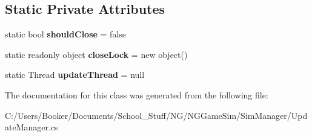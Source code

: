 \subsection*{Static Private Attributes}
\begin{DoxyCompactItemize}
\item 
\mbox{\label{class_n_g_sim_1_1_update_manager_a38b38d1c0b6bcc4415d72e0d7cead01f}} 
static bool {\bfseries should\+Close} = false
\item 
\mbox{\label{class_n_g_sim_1_1_update_manager_aa4e4b224b2d1cf86b2823c58a4ddf80d}} 
static readonly object {\bfseries close\+Lock} = new object()
\item 
\mbox{\label{class_n_g_sim_1_1_update_manager_ac522b9c2853459179f9d8839b810acc3}} 
static Thread {\bfseries update\+Thread} = null
\end{DoxyCompactItemize}


The documentation for this class was generated from the following file\+:\begin{DoxyCompactItemize}
\item 
C\+:/\+Users/\+Booker/\+Documents/\+School\+\_\+\+Stuff/\+N\+G/\+N\+G\+Game\+Sim/\+Sim\+Manager/Update\+Manager.\+cs\end{DoxyCompactItemize}
